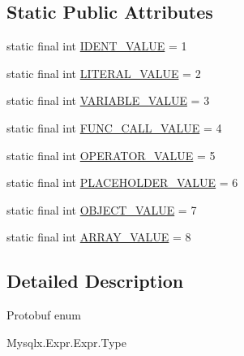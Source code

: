 \subsection*{Static Public Attributes}
\begin{DoxyCompactItemize}
\item 
static final int \mbox{\hyperlink{enumcom_1_1mysql_1_1cj_1_1x_1_1protobuf_1_1_mysqlx_expr_1_1_expr_1_1_type_a5aa78104af327754a708a6cd2f83be26}{I\+D\+E\+N\+T\+\_\+\+V\+A\+L\+UE}} = 1
\item 
static final int \mbox{\hyperlink{enumcom_1_1mysql_1_1cj_1_1x_1_1protobuf_1_1_mysqlx_expr_1_1_expr_1_1_type_a9d6b24d5c5f1064c2094e78580bbb6a5}{L\+I\+T\+E\+R\+A\+L\+\_\+\+V\+A\+L\+UE}} = 2
\item 
static final int \mbox{\hyperlink{enumcom_1_1mysql_1_1cj_1_1x_1_1protobuf_1_1_mysqlx_expr_1_1_expr_1_1_type_ae58eec508dfe934ed915ed8f8050ae8e}{V\+A\+R\+I\+A\+B\+L\+E\+\_\+\+V\+A\+L\+UE}} = 3
\item 
static final int \mbox{\hyperlink{enumcom_1_1mysql_1_1cj_1_1x_1_1protobuf_1_1_mysqlx_expr_1_1_expr_1_1_type_a5a9d023cd4958d41b32318ab00211f0c}{F\+U\+N\+C\+\_\+\+C\+A\+L\+L\+\_\+\+V\+A\+L\+UE}} = 4
\item 
static final int \mbox{\hyperlink{enumcom_1_1mysql_1_1cj_1_1x_1_1protobuf_1_1_mysqlx_expr_1_1_expr_1_1_type_a789081d24c76b754f49466fe247bb268}{O\+P\+E\+R\+A\+T\+O\+R\+\_\+\+V\+A\+L\+UE}} = 5
\item 
static final int \mbox{\hyperlink{enumcom_1_1mysql_1_1cj_1_1x_1_1protobuf_1_1_mysqlx_expr_1_1_expr_1_1_type_a56dc38bfdba7a3d9a1665e65af4b062f}{P\+L\+A\+C\+E\+H\+O\+L\+D\+E\+R\+\_\+\+V\+A\+L\+UE}} = 6
\item 
static final int \mbox{\hyperlink{enumcom_1_1mysql_1_1cj_1_1x_1_1protobuf_1_1_mysqlx_expr_1_1_expr_1_1_type_ad224808d02cde85be1f8db03fede4e51}{O\+B\+J\+E\+C\+T\+\_\+\+V\+A\+L\+UE}} = 7
\item 
static final int \mbox{\hyperlink{enumcom_1_1mysql_1_1cj_1_1x_1_1protobuf_1_1_mysqlx_expr_1_1_expr_1_1_type_a2e7aad8261fc401844556011b535f19f}{A\+R\+R\+A\+Y\+\_\+\+V\+A\+L\+UE}} = 8
\end{DoxyCompactItemize}


\subsection{Detailed Description}
Protobuf enum
\begin{DoxyCode}
Mysqlx.Expr.Expr.Type 
\end{DoxyCode}
 

